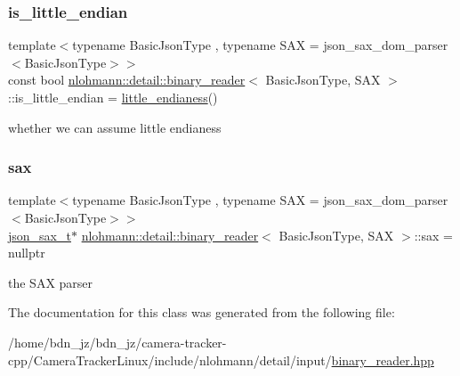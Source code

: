 \subsubsection{\texorpdfstring{is\+\_\+little\+\_\+endian}{is\_little\_endian}}
{\footnotesize\ttfamily template$<$typename Basic\+Json\+Type , typename S\+AX  = json\+\_\+sax\+\_\+dom\+\_\+parser$<$\+Basic\+Json\+Type$>$$>$ \\
const bool \hyperlink{classnlohmann_1_1detail_1_1binary__reader}{nlohmann\+::detail\+::binary\+\_\+reader}$<$ Basic\+Json\+Type, S\+AX $>$\+::is\+\_\+little\+\_\+endian = \hyperlink{classnlohmann_1_1detail_1_1binary__reader_a1e31dbfcf9567c8c2d4f0e4eb1b0230a}{little\+\_\+endianess}()\hspace{0.3cm}{\ttfamily [private]}}



whether we can assume little endianess 

\mbox{\label{classnlohmann_1_1detail_1_1binary__reader_ac9313177e414403e3e5784340d838b3f}} 
\subsubsection{\texorpdfstring{sax}{sax}}
{\footnotesize\ttfamily template$<$typename Basic\+Json\+Type , typename S\+AX  = json\+\_\+sax\+\_\+dom\+\_\+parser$<$\+Basic\+Json\+Type$>$$>$ \\
\hyperlink{classnlohmann_1_1detail_1_1binary__reader_a43c5dc6a3219f64a7824d7ba9c7b14ae}{json\+\_\+sax\+\_\+t}$\ast$ \hyperlink{classnlohmann_1_1detail_1_1binary__reader}{nlohmann\+::detail\+::binary\+\_\+reader}$<$ Basic\+Json\+Type, S\+AX $>$\+::sax = nullptr\hspace{0.3cm}{\ttfamily [private]}}



the S\+AX parser 



The documentation for this class was generated from the following file\+:\begin{DoxyCompactItemize}
\item 
/home/bdn\+\_\+jz/bdn\+\_\+jz/camera-\/tracker-\/cpp/\+Camera\+Tracker\+Linux/include/nlohmann/detail/input/\hyperlink{binary__reader_8hpp}{binary\+\_\+reader.\+hpp}\end{DoxyCompactItemize}
